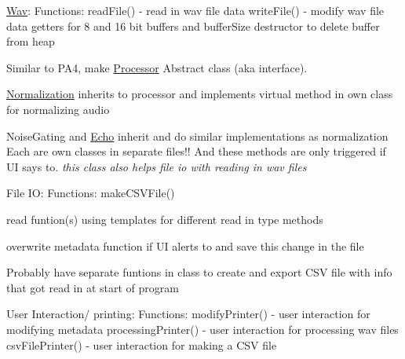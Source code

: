 \label{index_md_README}%
%
 \mbox{\hyperlink{class_wav}{Wav}}\+: Functions\+: read\+File() -\/ read in wav file data write\+File() -\/ modify wav file data getters for 8 and 16 bit buffers and buffer\+Size destructor to delete buffer from heap


\begin{DoxyEnumerate}
\item Similar to PA4, make \mbox{\hyperlink{class_processor}{Processor}} Abstract class (aka interface).
\item \mbox{\hyperlink{class_normalization}{Normalization}} inherits to processor and implements virtual method in own class for normalizing audio
\item Noise\+Gating and \mbox{\hyperlink{class_echo}{Echo}} inherit and do similar implementations as normalization Each are own classes in separate files!! And these methods are only triggered if UI says to. {\itshape this class also helps file io with reading in wav files}
\end{DoxyEnumerate}

File IO\+: Functions\+: make\+CSVFile()


\begin{DoxyEnumerate}
\item read funtion(s) using templates for different read in type methods
\item overwrite metadata function if UI alerts to and save this change in the file
\item Probably have separate funtions in class to create and export CSV file with info that got read in at start of program
\end{DoxyEnumerate}

User Interaction/ printing\+: Functions\+: modify\+Printer() -\/ user interaction for modifying metadata processing\+Printer() -\/ user interaction for processing wav files csv\+File\+Printer() -\/ user interaction for making a CSV file


